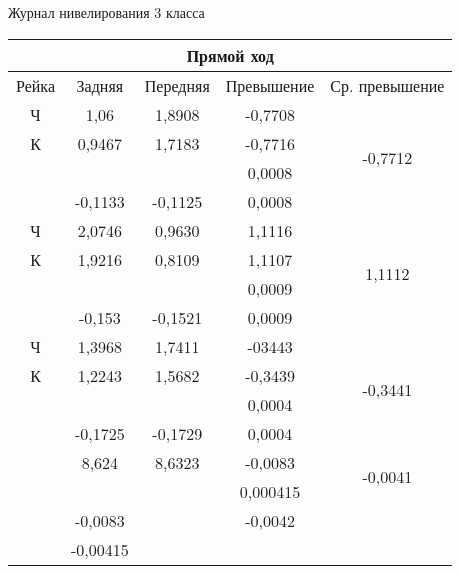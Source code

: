 \documentclass[a4paper]{article}
\begin{document}
\begin{newpage}
\begin{center}
\normalsize{
Журнал нивелирования 3 класса
\\
\begin{tabular}{|c|c|c|c|c|}
\hline
\multicolumn{5}{|c|}{Прямой ход}\\
\hline
Рейка & Задняя & Передняя & Превышение & Ср. превышение\\
\hline
Ч & 1,06    & 1,8908  & -0,7708 & \multirow{4}{*}{-0,7712}\\
\cline{1-4}
К & 0,9467  & 1,7183  & -0,7716 & \\
\cline{1-4}
  &         &         & 0,0008  & \\
  & -0,1133 & -0,1125 & 0,0008  & \\\hline
Ч & 2,0746  & 0,9630  & 1,1116  & \multirow{4}{*}{1,1112}\\
\cline{1-4}
К & 1,9216  & 0,8109  & 1,1107  & \\
\cline{1-4}
  &         &         & 0,0009  & \\
  & -0,153  & -0,1521 & 0,0009  & \\
\hline
Ч & 1,3968 & 1,7411   & -03443  & \multirow{4}{*}{-0,3441}\\
\cline{1-4}
К & 1,2243 & 1,5682   & -0,3439 & \\
\cline{1-4}
  &         &         & 0,0004  & \\
  & -0,1725 & -0,1729 & 0,0004  & \\
\hline
  & 8,624   & 8,6323  & -0,0083 & \multirow{2}{*}{-0,0041}\\
  &         &         & 0,000415& \\
\hline
  & -0,0083 &         & -0,0042 & \\
  & -0,00415&         &         & \\
\hline


\end{tabular}}
\end{center}
\end{newpage}
\end{document}
